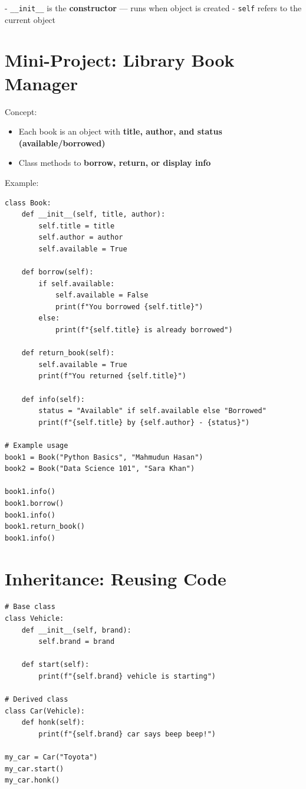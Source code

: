 - \texttt{\_\_init\_\_} is the \textbf{constructor} — runs when object is created  
- \texttt{self} refers to the current object  

\section{Mini-Project: Library Book Manager}

Concept:

\begin{itemize}
    \item Each book is an object with \textbf{title, author, and status (available/borrowed)}  
    \item Class methods to \textbf{borrow, return, or display info}  
\end{itemize}

Example:

\begin{verbatim}
class Book:
    def __init__(self, title, author):
        self.title = title
        self.author = author
        self.available = True

    def borrow(self):
        if self.available:
            self.available = False
            print(f"You borrowed {self.title}")
        else:
            print(f"{self.title} is already borrowed")

    def return_book(self):
        self.available = True
        print(f"You returned {self.title}")

    def info(self):
        status = "Available" if self.available else "Borrowed"
        print(f"{self.title} by {self.author} - {status}")

# Example usage
book1 = Book("Python Basics", "Mahmudun Hasan")
book2 = Book("Data Science 101", "Sara Khan")

book1.info()
book1.borrow()
book1.info()
book1.return_book()
book1.info()
\end{verbatim}

\section{Inheritance: Reusing Code}

\begin{verbatim}
# Base class
class Vehicle:
    def __init__(self, brand):
        self.brand = brand

    def start(self):
        print(f"{self.brand} vehicle is starting")

# Derived class
class Car(Vehicle):
    def honk(self):
        print(f"{self.brand} car says beep beep!")

my_car = Car("Toyota")
my_car.start()
my_car.honk()
\end{verbatim}

